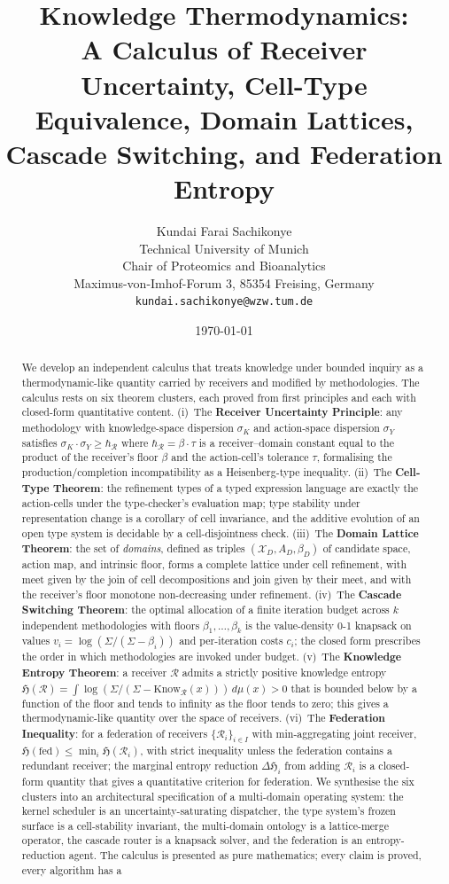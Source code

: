 \documentclass[11pt,a4paper]{article}
\title{\textbf{Knowledge Thermodynamics:\\[3pt]
A Calculus of Receiver Uncertainty, Cell-Type Equivalence, Domain Lattices,\\[2pt]
Cascade Switching, and Federation Entropy}}
\author{Kundai Farai Sachikonye\\
Technical University of Munich\\
Chair of Proteomics and Bioanalytics\\
Maximus-von-Imhof-Forum 3, 85354 Freising, Germany\\
\texttt{kundai.sachikonye@wzw.tum.de}}
\date{\today}
\newcommand{\Cands}{\mathcal{X}}
\newcommand{\receiver}{\mathcal{R}}
\newcommand{\Sigmax}{\Sigma}
\newcommand{\hbarR}{\hbar_{\receiver}}
\newcommand{\disp}{\sigma}
\newcommand{\Know}{\mathrm{Know}}
\newcommand{\Hknow}{\mathfrak{H}}
\begin{document}
\maketitle

\begin{abstract}
We develop an independent calculus that treats knowledge under bounded inquiry as a thermodynamic-like quantity carried by receivers and modified by methodologies. The calculus rests on six theorem clusters, each proved from first principles and each with closed-form quantitative content. (i)~The \textbf{Receiver Uncertainty Principle}: any methodology with knowledge-space dispersion $\disp_K$ and action-space dispersion $\disp_Y$ satisfies $\disp_K \cdot \disp_Y \geq \hbarR$ where $\hbarR = \beta \cdot \tau$ is a receiver--domain constant equal to the product of the receiver's floor $\beta$ and the action-cell's tolerance $\tau$, formalising the production/completion incompatibility as a Heisenberg-type inequality. (ii)~The \textbf{Cell-Type Theorem}: the refinement types of a typed expression language are exactly the action-cells under the type-checker's evaluation map; type stability under representation change is a corollary of cell invariance, and the additive evolution of an open type system is decidable by a cell-disjointness check. (iii)~The \textbf{Domain Lattice Theorem}: the set of \emph{domains}, defined as triples $(\Cands_D, A_D, \beta_D)$ of candidate space, action map, and intrinsic floor, forms a complete lattice under cell refinement, with meet given by the join of cell decompositions and join given by their meet, and with the receiver's floor monotone non-decreasing under refinement. (iv)~The \textbf{Cascade Switching Theorem}: the optimal allocation of a finite iteration budget across $k$ independent methodologies with floors $\beta_1, \ldots, \beta_k$ is the value-density 0-1 knapsack on values $v_i = \log(\Sigmax/(\Sigmax-\beta_i))$ and per-iteration costs $c_i$; the closed form prescribes the order in which methodologies are invoked under budget. (v)~The \textbf{Knowledge Entropy Theorem}: a receiver $\receiver$ admits a strictly positive knowledge entropy $\Hknow(\receiver) = \int \log(\Sigmax/(\Sigmax - \Know_\receiver(x))) \, d\mu(x) > 0$ that is bounded below by a function of the floor and tends to infinity as the floor tends to zero; this gives a thermodynamic-like quantity over the space of receivers. (vi)~The \textbf{Federation Inequality}: for a federation of receivers $\{\receiver_i\}_{i \in I}$ with min-aggregating joint receiver, $\Hknow(\mathrm{fed}) \leq \min_i \Hknow(\receiver_i)$, with strict inequality unless the federation contains a redundant receiver; the marginal entropy reduction $\Delta\Hknow_i$ from adding $\receiver_i$ is a closed-form quantity that gives a quantitative criterion for federation. We synthesise the six clusters into an architectural specification of a multi-domain operating system: the kernel scheduler is an uncertainty-saturating dispatcher, the type system's frozen surface is a cell-stability invariant, the multi-domain ontology is a lattice-merge operator, the cascade router is a knapsack solver, and the federation is an entropy-reduction agent. The calculus is presented as pure mathematics; every claim is proved, every algorithm has a 
\end{abstract}
\end{document}

